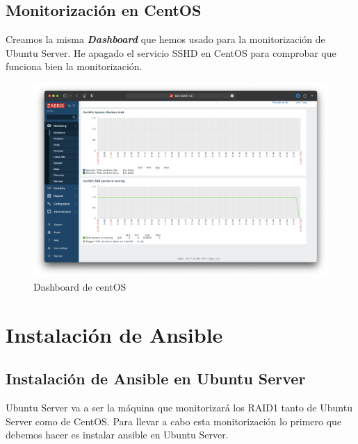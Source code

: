 \subsection{Monitorización en CentOS}
Creamos la misma \textbf{\emph{Dashboard}} que hemos usado para la monitorización de Ubuntu Server. He apagado el servicio SSHD en CentOS para comprobar
que funciona bien la monitorización.
    \begin{figure}[H]
        \centering
        \includegraphics[scale=0.275]{images/centOS_dashboard.png}
        \caption{Dashboard de centOS}
        \label{fig:centOS_dashboard}
    \end{figure}

\newpage
\section{Instalación de Ansible}
\subsection{Instalación de Ansible en Ubuntu Server}
Ubuntu Server va a ser la máquina que monitorizará los RAID1 tanto de Ubuntu Server como de CentOS. Para llevar a cabo esta
monitorización lo primero que debemos hacer es instalar ansible en Ubuntu Server.

